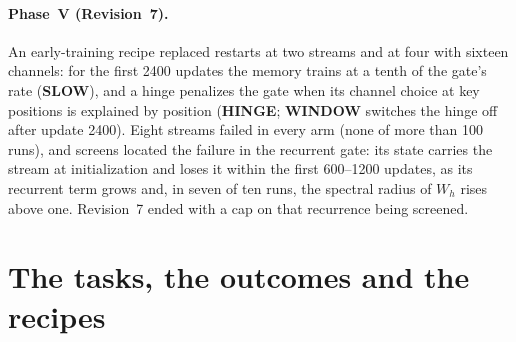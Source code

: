 \documentclass[11pt]{article}
\begin{document}
\paragraph{Phase~V (Revision~7).} An early-training recipe replaced restarts at two streams and at four with sixteen channels: for the first 2400 updates the memory trains at a tenth of the gate's rate (\textbf{SLOW}), and a hinge penalizes the gate when its channel choice at key positions is explained by position (\textbf{HINGE}; \textbf{WINDOW} switches the hinge off after update 2400). Eight streams failed in every arm (none of more than 100 runs), and screens located the failure in the recurrent gate: its state carries the stream at initialization and loses it within the first 600--1200 updates, as its recurrent term grows and, in seven of ten runs, the spectral radius of $W_h$ rises above one. Revision~7 ended with a cap on that recurrence being screened.

\section{The tasks, the outcomes and the recipes}
\label{sec:task}
\end{document}
